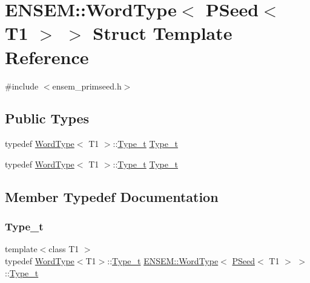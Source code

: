 \hypertarget{structENSEM_1_1WordType_3_01PSeed_3_01T1_01_4_01_4}{}\section{E\+N\+S\+EM\+:\+:Word\+Type$<$ P\+Seed$<$ T1 $>$ $>$ Struct Template Reference}
\label{structENSEM_1_1WordType_3_01PSeed_3_01T1_01_4_01_4}


{\ttfamily \#include $<$ensem\+\_\+primseed.\+h$>$}

\subsection*{Public Types}
\begin{DoxyCompactItemize}
\item 
typedef \mbox{\hyperlink{structENSEM_1_1WordType}{Word\+Type}}$<$ T1 $>$\+::\mbox{\hyperlink{structENSEM_1_1WordType_3_01PSeed_3_01T1_01_4_01_4_a7ec3ab016c8f9b1265ec9fe4ddf9053d}{Type\+\_\+t}} \mbox{\hyperlink{structENSEM_1_1WordType_3_01PSeed_3_01T1_01_4_01_4_a7ec3ab016c8f9b1265ec9fe4ddf9053d}{Type\+\_\+t}}
\item 
typedef \mbox{\hyperlink{structENSEM_1_1WordType}{Word\+Type}}$<$ T1 $>$\+::\mbox{\hyperlink{structENSEM_1_1WordType_3_01PSeed_3_01T1_01_4_01_4_a7ec3ab016c8f9b1265ec9fe4ddf9053d}{Type\+\_\+t}} \mbox{\hyperlink{structENSEM_1_1WordType_3_01PSeed_3_01T1_01_4_01_4_a7ec3ab016c8f9b1265ec9fe4ddf9053d}{Type\+\_\+t}}
\end{DoxyCompactItemize}


\subsection{Member Typedef Documentation}
\mbox{\label{structENSEM_1_1WordType_3_01PSeed_3_01T1_01_4_01_4_a7ec3ab016c8f9b1265ec9fe4ddf9053d}} 
\subsubsection{\texorpdfstring{Type\_t}{Type\_t}\hspace{0.1cm}{\footnotesize\ttfamily [1/2]}}
{\footnotesize\ttfamily template$<$class T1 $>$ \\
typedef \mbox{\hyperlink{structENSEM_1_1WordType}{Word\+Type}}$<$T1$>$\+::\mbox{\hyperlink{structENSEM_1_1WordType_3_01PSeed_3_01T1_01_4_01_4_a7ec3ab016c8f9b1265ec9fe4ddf9053d}{Type\+\_\+t}} \mbox{\hyperlink{structENSEM_1_1WordType}{E\+N\+S\+E\+M\+::\+Word\+Type}}$<$ \mbox{\hyperlink{classENSEM_1_1PSeed}{P\+Seed}}$<$ T1 $>$ $>$\+::\mbox{\hyperlink{structENSEM_1_1WordType_3_01PSeed_3_01T1_01_4_01_4_a7ec3ab016c8f9b1265ec9fe4ddf9053d}{Type\+\_\+t}}}

